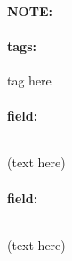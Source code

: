 \documentclass[12pt]{article}
\newenvironment{note}{\paragraph{NOTE:}}{}
\newenvironment{field}{\paragraph{field:}}{}
\newcommand*{\tags}[1]{\paragraph{tags: }#1}
\begin{document}
\begin{note}
    \tags{tag here}
    \begin{field}
    \[  
    \] 
    \begin{center}
    (text here)
    \end{center}
    \end{field}
    \begin{field}
    \[
    \] 
    \begin{center}
    (text here)
    \end{center}
    \end{field}
\end{note}
\end{document}
